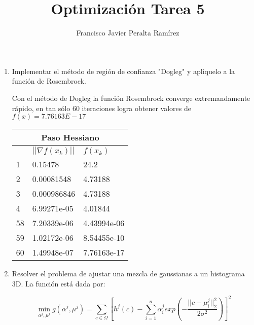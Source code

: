 \documentclass[10pt]{article}
\title {Optimización Tarea 5}
\author {Francisco Javier Peralta Ramírez}
\begin{document}
\maketitle
\begin{enumerate}

\item Implementar el método de región de confianza "Dogleg" y apliquelo a la función de Rosembrock.

Con el método de Dogleg la función Rosembrock converge extremandamente rápido, en tan sólo 60 iteraciones logra obtener valores de $f(x) = 7.76163E-17$
\begin{table}[ht]
\centering
\label{my-label}
  \begin{tabular}{lll}
  \multicolumn{3}{c}{Paso Hessiano} \\ \hline
  \rowcolor[HTML]{DBDBDB} 
  \multicolumn{1}{|l|}{\cellcolor[HTML]{DBDBDB}k} & \multicolumn{1}{l|}{\cellcolor[HTML]{DBDBDB}$||\nabla f (x_k )||$}       & \multicolumn{1}{l|}{\cellcolor[HTML]{DBDBDB}$f(x_k)$} \\ \hline
  \multicolumn{1}{|l|}{1}  & \multicolumn{1}{l|}{0.15478}  &\multicolumn{1}{l|}{24.2} \\ \hline
  \multicolumn{1}{|l|}{2}  & \multicolumn{1}{l|}{0.00081548} & \multicolumn{1}{l|}{4.73188} \\ \hline
  \multicolumn{1}{|l|}{3}  & \multicolumn{1}{l|}{0.000986846}  & \multicolumn{1}{l|}{4.73188} \\ \hline
  \multicolumn{1}{|l|}{4}  & \multicolumn{1}{l|}{6.99271e-05}  & \multicolumn{1}{l|}{4.01844} \\ \hline
  \multicolumn{1}{|l|}{58} & \multicolumn{1}{l|}{7.20339e-06}  & \multicolumn{1}{l|}{4.43994e-06} \\ \hline
  \multicolumn{1}{|l|}{59} & \multicolumn{1}{l|}{1.02172e-06}  & \multicolumn{1}{l|}{8.54455e-10} \\ \hline
  \multicolumn{1}{|l|}{60} & \multicolumn{1}{l|}{1.49948e-07}  & \multicolumn{1}{l|}{7.76163e-17} \\ \hline
  \end{tabular}
\end{table}

\item Resolver el problema de ajustar una mezcla de gaussianas a un histograma 3D. La función está dada por:

$$\min_{\alpha^j, \mu^j}g(\alpha^j, \mu^j) = \sum_{c\in\Omega} [ h^j(c) - \sum_{i = 1}^{n} \alpha_i^j exp\left( -\frac{||c - \mu_i^j||^2_2}{2\sigma^2} \right)]^2$$


\end{enumerate}
\end{document}
